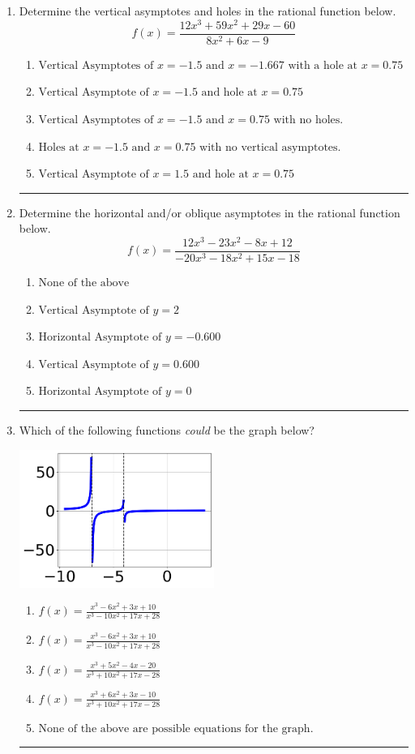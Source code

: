 \documentclass[14pt]{extbook}
\newcommand{\litem}[1]{\item#1\hspace*{-1cm}\rule{\textwidth}{0.4pt}}
\begin{document}
\begin{enumerate}
{\begin{enumerate}[label=\Alph*.]
\end{enumerate} }
\litem{
Determine the vertical asymptotes and holes in the rational function below.\[ f(x) = \frac{12x^{3} +59 x^{2} +29 x -60}{8x^{2} +6 x -9} \]\begin{enumerate}[label=\Alph*.]
\item \( \text{Vertical Asymptotes of } x = -1.5 \text{ and } x = -1.667 \text{ with a hole at } x = 0.75 \)
\item \( \text{Vertical Asymptote of } x = -1.5 \text{ and hole at } x = 0.75 \)
\item \( \text{Vertical Asymptotes of } x = -1.5 \text{ and } x = 0.75 \text{ with no holes.} \)
\item \( \text{Holes at } x = -1.5 \text{ and } x = 0.75 \text{ with no vertical asymptotes.} \)
\item \( \text{Vertical Asymptote of } x = 1.5 \text{ and hole at } x = 0.75 \)

\end{enumerate} }
\litem{
Determine the horizontal and/or oblique asymptotes in the rational function below.\[ f(x) = \frac{12x^{3} -23 x^{2} -8 x + 12}{-20x^{3} -18 x^{2} +15 x -18} \]\begin{enumerate}[label=\Alph*.]
\item \( \text{None of the above} \)
\item \( \text{Vertical Asymptote of } y = 2  \)
\item \( \text{Horizontal Asymptote of } y = -0.600  \)
\item \( \text{Vertical Asymptote of } y = 0.600  \)
\item \( \text{Horizontal Asymptote of } y = 0  \)

\end{enumerate} }
\litem{
Which of the following functions \textit{could} be the graph below?
\begin{center}
    \includegraphics[width=0.5\textwidth]{../Figures/identifyGraphOfRationalFunctionCopyC.png}
\end{center}
\begin{enumerate}[label=\Alph*.]
\item \( f(x)=\frac{x^{3} -6 x^{2} +3 x + 10}{x^{3} -10 x^{2} +17 x + 28} \)
\item \( f(x)=\frac{x^{3} -6 x^{2} +3 x + 10}{x^{3} -10 x^{2} +17 x + 28} \)
\item \( f(x)=\frac{x^{3} +5 x^{2} -4 x -20}{x^{3} +10 x^{2} +17 x -28} \)
\item \( f(x)=\frac{x^{3} +6 x^{2} +3 x -10}{x^{3} +10 x^{2} +17 x -28} \)
\item \( \text{None of the above are possible equations for the graph.} \)


\end{enumerate}}
\end{enumerate}
\end{document}
